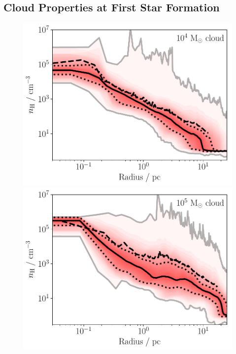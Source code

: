 \documentclass[a4paper,fleqn,usenatbib]{mnras}
\begin{document}
\subsection{Cloud Properties at First Star Formation}
\label{ana:cloudprops}

\begin{figure}
\includegraphics[width=\columnwidth]{../plots/gradrays/IMF1_01/nH/profile_starpos00018.pdf}
\includegraphics[width=\columnwidth]{../plots/gradrays/MASS_01/nH/profile_starpos00016.pdf}

\end{figure}
\end{document}
